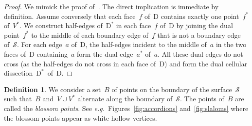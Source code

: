 \documentclass{amsart}
\theoremstyle{definition}
\newtheorem{definition}[theorem]{Definition}
\newtheorem{remark}[theorem]{Remark}
\newcommand{\eg}{\textit{e.g.}~} %
\newcommand{\darkblue}{\color{darkblue}} %
\newcommand{\defn}[1]{\textsl{\darkblue #1}} %
\newcommand{\surface}{\mathcal{S}} %
\newcommand{\dual}{^*} %
\newcommand{\dissection}{\mathrm{D}} %
\begin{document}
\begin{proof}
We mimick the proof of~\cite[Prop.~1.12]{OpperPlamondonSchroll}.
The direct implication is immediate by definition.
Assume conversely that each face~$f$ of~$\dissection$ contains exactly one point~$f\dual$ of~$V\dual$.
We construct half-edges of~$\dissection\dual$ in each face~$f$ of~$\dissection$ by joining the dual point~$f\dual$ to the middle of each boundary edge of~$f$ that is not a boundary edge of~$\surface$.
For each edge~$a$ of~$\dissection$, the half-edges incident to the middle of~$a$ in the two faces of~$\dissection$ containing~$a$ form the dual edge~$a\dual$ of~$a$.
All these dual edges do not cross (as the half-edges do not cross in each face of~$\dissection$) and form the dual cellular dissection~$\dissection\dual$~of~$\dissection$.
\end{proof}


\begin{definition}
We consider a set~$B$ of points on the boundary of the surface~$\surface$ such that~$B$ and~$V \cup V\dual$ alternate along the boundary of~$\surface$.
The points of~$B$ are called the \defn{blossom points}.
See \eg Figures~\ref{fig:accordions} and~\ref{fig:slaloms} where the blossom points appear as white hollow vertices.
\end{definition}
\end{document}

